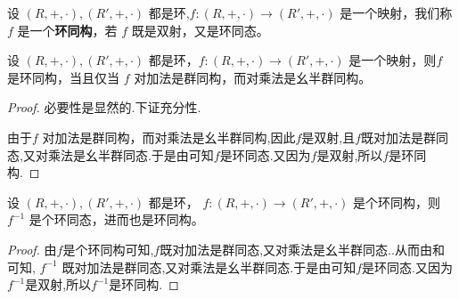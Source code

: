 \documentclass[../../main.tex]{subfiles}
\begin{document}
\begin{definition}[环同构]
设 $(R, +, \cdot),(R', +, \cdot)$ 都是环,$f : (R, +, \cdot) \to (R', +, \cdot)$ 是一个映射，我们称 $f$ 是一个\textbf{环同构}，若 $f$ 既是双射，又是环同态。
\end{definition}

\begin{lemma}\label{lemma:环同构等价于对加法是群同构对乘法是幺半群同构}
设 $(R, +, \cdot),(R', +, \cdot)$ 都是环，$f : (R, +, \cdot) \to (R', +, \cdot)$ 是一个映射，则$f$ 是环同构，当且仅当 $f$ 对加法是群同构，而对乘法是幺半群同构。
\end{lemma}
\begin{proof}
必要性是显然的.下证充分性.

由于$f$ 对加法是群同构，而对乘法是幺半群同构,因此$f$是双射,且$f$既对加法是群同态,又对乘法是幺半群同态.于是由可知$f$是环同态.又因为$f$是双射,所以$f$是环同构.
\end{proof}

\begin{lemma}\label{lemma:环同构的逆还是环同构}
设 $(R, +, \cdot),(R', +, \cdot)$ 都是环， $f : (R, +, \cdot) \to (R', +, \cdot)$ 是个环同构，则 $f^{-1}$ 是个环同态，进而也是环同构。
\end{lemma}
\begin{proof}
由$f$是个环同构可知,$f$既对加法是群同态,又对乘法是幺半群同态..从而由和可知, $f^{-1}$ 既对加法是群同态,又对乘法是幺半群同态.于是由可知$f$是环同态.又因为$f^{-1}$是双射,所以$f^{-1}$是环同构.
\end{proof}
\end{document}

